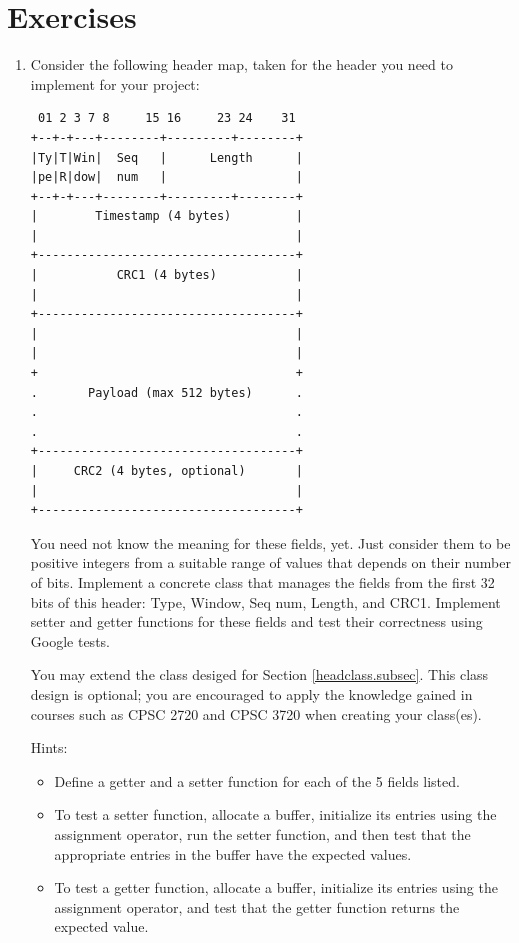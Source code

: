 \documentclass[12pt]{book}
\begin{document}
\section{Exercises}

\begin{enumerate}[label=\arabic*.]
\item Consider the following header map, taken for the header you need to implement for your project:
\begin{verbatim}
 01 2 3 7 8     15 16     23 24    31
+--+-+---+--------+---------+--------+
|Ty|T|Win|  Seq   |      Length      |
|pe|R|dow|  num   |                  |
+--+-+---+--------+---------+--------+
|        Timestamp (4 bytes)         |
|                                    |
+------------------------------------+
|           CRC1 (4 bytes)           |
|                                    |
+------------------------------------+
|                                    |
|                                    |
+                                    +
.       Payload (max 512 bytes)      .
.                                    .
.                                    .
+------------------------------------+
|     CRC2 (4 bytes, optional)       |
|                                    |
+------------------------------------+
\end{verbatim}

You need not know the meaning for these fields, yet. Just consider them to be positive integers from a suitable range of values that depends on their number of bits.
Implement a concrete class that manages the fields from the first 32 bits of this header: Type, Window, Seq num, Length, and CRC1. Implement setter and getter functions for these fields and test their correctness using Google tests.

You may extend the class desiged for Section \ref{headclass.subsec}. This class design is optional; you are encouraged to apply the knowledge gained in courses such as CPSC 2720 and CPSC 3720 when creating your class(es).

Hints:
\begin{itemize}[label=--]
\item Define a getter and a setter function for each of the 5 fields listed.
\item To test a setter function, allocate a buffer, initialize its entries using the assignment operator, run the setter function, and then test that the appropriate entries in the buffer have the expected values.
  \item To test a getter function, allocate a buffer, initialize its entries using the assignment operator, and test that the getter function returns the expected value.
\end{itemize}

\end{enumerate}
\end{document}
